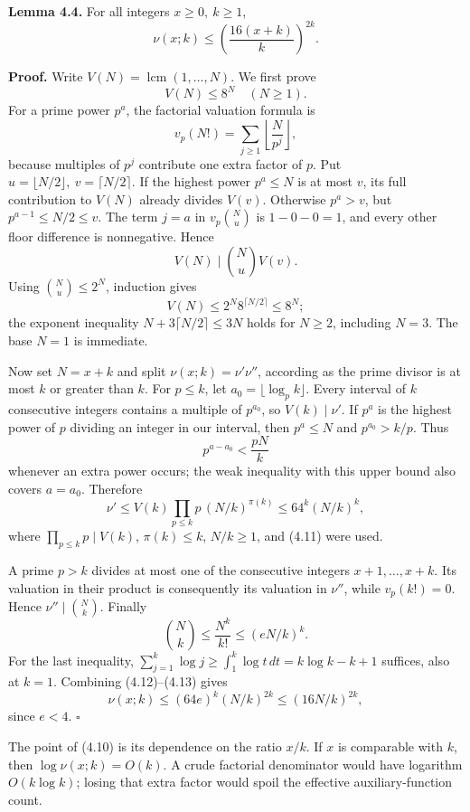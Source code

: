 \documentclass[
  11pt,
  a4paper,
]{article}
\begin{document}
\textbf{Lemma 4.4.} For all integers \(x\ge0,\ k\ge1\), \[
\nu(x;k)\le\left(\frac{16(x+k)}k\right)^{2k}. \tag{4.10}
\]

\textbf{Proof.} Write \(V(N)=\operatorname{lcm}(1,\ldots,N)\). We first
prove \[
V(N)\le8^N\quad(N\ge1). \tag{4.11}
\] For a prime power \(p^a\), the factorial valuation formula is \[
v_p(N!)=\sum_{j\ge1}\left\lfloor\frac{N}{p^j}\right\rfloor,
\] because multiples of \(p^j\) contribute one extra factor of \(p\).
Put \(u=\lfloor N/2\rfloor,\ v=\lceil N/2\rceil\). If the highest power
\(p^a\le N\) is at most \(v\), its full contribution to \(V(N)\) already
divides \(V(v)\). Otherwise \(p^a>v\), but \(p^{a-1}\le N/2\le v\). The
term \(j=a\) in \(v_p\binom Nu\) is \(1-0-0=1\), and every other floor
difference is nonnegative. Hence \[
V(N)\mid \binom Nu V(v).
\] Using \(\binom Nu\le2^N\), induction gives \[
V(N)\le2^N8^{\lceil N/2\rceil}\le8^N;
\] the exponent inequality \(N+3\lceil N/2\rceil\le3N\) holds for
\(N\ge2\), including \(N=3\). The base \(N=1\) is immediate.

Now set \(N=x+k\) and split \(\nu(x;k)=\nu'\nu''\), according as the
prime divisor is at most \(k\) or greater than \(k\). For \(p\le k\),
let \(a_0=\lfloor\log_p k\rfloor\). Every interval of \(k\) consecutive
integers contains a multiple of \(p^{a_0}\), so \(V(k)\mid\nu'\). If
\(p^a\) is the highest power of \(p\) dividing an integer in our
interval, then \(p^a\le N\) and \(p^{a_0}>k/p\). Thus \[
p^{a-a_0}<\frac{pN}{k}
\] whenever an extra power occurs; the weak inequality with this upper
bound also covers \(a=a_0\). Therefore \[
\nu'\le V(k)\prod_{p\le k}p\,(N/k)^{\pi(k)}
\le64^k(N/k)^k, \tag{4.12}
\] where \(\prod_{p\le k}p\mid V(k)\), \(\pi(k)\le k\), \(N/k\ge1\), and
(4.11) were used.

A prime \(p>k\) divides at most one of the consecutive integers
\(x+1,\ldots,x+k\). Its valuation in their product is consequently its
valuation in \(\nu''\), while \(v_p(k!)=0\). Hence
\(\nu''\mid\binom Nk\). Finally \[
\binom Nk\le\frac{N^k}{k!}\le(eN/k)^k. \tag{4.13}
\] For the last inequality,
\(\sum_{j=1}^k\log j\ge\int_1^k\log t\,dt=k\log k-k+1\) suffices, also
at \(k=1\). Combining (4.12)--(4.13) gives \[
\nu(x;k)\le(64e)^k(N/k)^{2k}
\le(16N/k)^{2k},
\] since \(e<4\). \(\square\)

The point of (4.10) is its dependence on the ratio \(x/k\). If \(x\) is
comparable with \(k\), then \(\log\nu(x;k)=O(k)\). A crude factorial
denominator would have logarithm \(O(k\log k)\); losing that extra
factor would spoil the effective auxiliary-function count.
\end{document}
